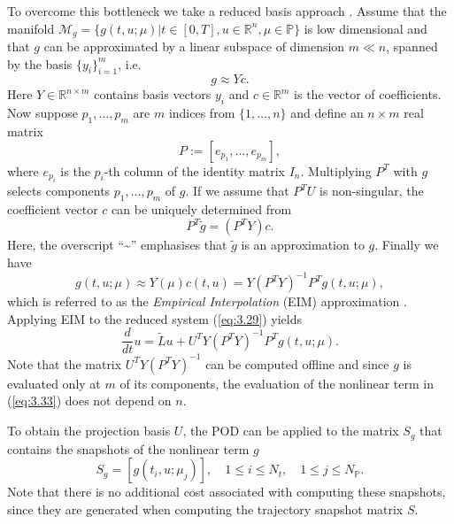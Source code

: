 To overcome this bottleneck we take a reduced basis approach \cite{doi:10.1137/090766498,barrault2004empirical}. Assume that the manifold $\mathcal M_{g} = \{ g(t,u;\mu)| t\in [0,T], u \in \mathbb R^n , \mu \in \mathbb P\}$ is low dimensional and that $g$ can be approximated by a linear subspace of dimension $m\ll n$, spanned by the basis $\{ y_i \}_{i=1}^m$, i.e.
\begin{equation} \label{eq:3.30}
	g \approx Yc.
\end{equation}
Here $Y\in \mathbb R^{n\times m}$ contains basis vectors $y_i$ and $c\in \mathbb R^{m}$ is the vector of coefficients. Now suppose $p_1,\dots,p_m$ are $m$ indices from $\{1,\dots,n\}$ and define an $n\times m$ real matrix
\begin{equation} \label{eq:MoOr:11}
P := [e_{p_1},\dots,e_{p_m}],
\end{equation}
where $e_{p_i}$ is the $p_i$-th column of the identity matrix $I_n$. Multiplying $P^T$ with $g$ selects components $p_1,\dots,p_m$ of $g$. If we assume that $P^TU$ is non-singular, the coefficient vector $c$ can be uniquely determined from
\begin{equation} \label{eq:3.31}
	P^T \tilde g = (P^T Y) c.
\end{equation}
Here, the overscript ``\textasciitilde'' emphasises that $\tilde g$ is an approximation to $g$. Finally we have 
\begin{equation} \label{eq:3.32}
	g(t,u;\mu) \approx Y(\mu) c(t,u) = Y (P^TY)^{-1} P^T g(t,u;\mu),
\end{equation}
which is referred to as the \emph{Empirical Interpolation} (EIM) approximation \cite{barrault2004empirical}. Applying EIM to the reduced system (\ref{eq:3.29}) yields
\begin{equation} \label{eq:3.33}
	\frac{d}{dt} u = \tilde L u + U^T Y (P^TY)^{-1} P^T g(t,u;\mu).
\end{equation}
Note that the matrix $U^T Y (P^TY)^{-1}$ can be computed offline and since $g$ is evaluated only at $m$ of its components, the evaluation of the nonlinear term in (\ref{eq:3.33}) does not depend on $n$.

To obtain the projection basis $U$, the POD can be applied to the matrix $S_g$ that contains the snapshots of the nonlinear term $g$
\begin{equation} \label{eq:3.34}
	S_g = [g(t_i,u;\mu_j)],\quad 1\leq i \leq N_t,\quad 1 \leq j \leq N_{\mathbb P}.
\end{equation}
Note that there is no additional cost associated with computing these snapshots, since they are generated when computing the trajectory snapshot matrix $S$. 

